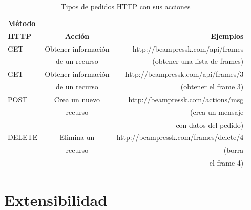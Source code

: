 		\begin{table}[tb]
			\caption{Tipos de pedidos HTTP con sus acciones}
			\label{tab:request}
			\centering
		
			\begin{tabular}{l|c|r}
			\hline
		
			\hline
			\textbf{Método} & & \\ 
			\textbf{HTTP} & \textbf{Acción} & \textbf{Ejemplos} \\
			\hline
				GET & Obtener información &  http://beampressk.com/api/frames \\ 
				& de un recurso & (obtener una lista de frames) \\
			\hline

			\hline
				GET & Obtener información &  http://beampressk.com/api/frames/3 \\ 
				& de un recurso & (obtener el frame 3) \\
			\hline

			\hline
				POST & Crea un nuevo &  http://beampressk.com/actions/msg \\ 
				& recurso & (crea un mensaje \\ 
				& &con datos del pedido)\\
			\hline

			\hline
				DELETE & Elimina un &  http://beampressk.com/frames/delete/4 \\ 
				& recurso & (borra \\ 
				& &el frame 4)\\
			\hline										
		
			\hline
			\end{tabular}
		\end{table}
		

	\section{Extensibilidad} %
	\label{sec:extensibilidad}
	





